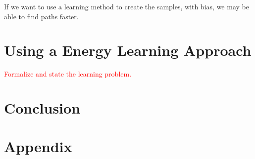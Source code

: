 \documentclass[11pt]{article}
\begin{document}
If we want to use a learning method to create the samples, with bias, we may be able to find paths faster. 


\section{Using a Energy Learning Approach}\label{sec:learning}

\textcolor{red}{Formalize and state the learning problem.}

\section{Conclusion}\label{sec:conclusion}



\newpage



\newpage
\appendix 

\section{Appendix}\label{sec:appendix}
\end{document}
